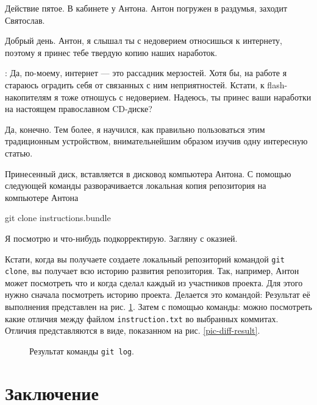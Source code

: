\documentclass[14pt,a4paper]{article}
\begin{document}
Действие пятое. 
В кабинете у Антона. Антон погружен в раздумья, заходит Святослав.

 Добрый день. Антон, я слышал ты с недоверием относишься к интернету, поэтому я принес
тебе твердую копию наших наработок. 

: Да, по-моему, интернет --- это рассадник мерзостей. 
Хотя бы, на работе я стараюсь оградить себя от связанных с ним неприятностей. 
Кстати, к flash-накопителям я тоже отношусь с недоверием. Надеюсь, ты принес ваши наработки
на настоящем православном CD-диске? 

 Да, конечно. Тем более, я научился, как правильно пользоваться
этим традиционным устройством, внимательнейшим образом изучив одну интересную статью.

Принесенный диск, вставляется в дисковод компьютера Антона. С помощью следующей команды разворачивается
локальная копия репозитория на компьютере Антона

git clone instructions.bundle

 Я посмотрю и что-нибудь подкорректирую. Загляну с оказией.

 Кстати, когда вы получаете создаете локальный репозиторий командой \texttt{git clone}, 
вы получает всю историю развития репозитория. Так, например, Антон может посмотреть что и когда 
сделал каждый из участников проекта. Для этого нужно сначала посмотреть историю проекта.
Делается это командой:  Результат её выполнения представлен
на рис. \ref{pic-git-log}.
Затем с помощью команды:
можно посмотреть какие отличия между файлом \texttt{instruction.txt} во выбранных коммитах.
Отличия представляются в виде, показанном на рис. \ref{pic-diff-result}.
\begin{figure}
	\centering
	\showtext{}
	\caption{Результат команды \texttt{git log}.}
	\label{pic-git-log}
\end{figure}


\section{Заключение}
\end{document}

